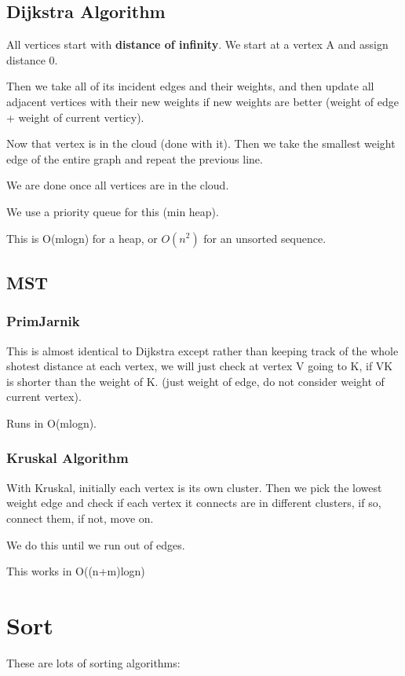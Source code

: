 \documentclass[12pt,letterpaper]{article} \usepackage{amsmath} \usepackage{graphicx} \usepackage[margin=1in]{geometry} \usepackage{longtable}  \usepackage{amssymb}
\begin{document}
	\subsection{Dijkstra Algorithm}
	All vertices start with \textbf{distance of infinity}. We start at a vertex A and assign distance 0. 
	
	Then we take all of its incident edges and their weights, and then update all adjacent vertices with their new weights if new weights are better (weight of edge + weight of current verticy).
	
	Now that vertex is in the cloud (done with it). Then we take the smallest weight edge of the entire graph and repeat the previous line. 
	
	We are done once all vertices are in the cloud. 
	
	We use a priority queue for this (min heap).
	
	This is O(mlogn) for a heap, or $O(n^2)$ for an unsorted sequence.  
	
	\subsection{MST}
	
	\subsubsection{PrimJarnik}
	This is almost identical to Dijkstra except rather than keeping track of the whole shotest distance at each vertex, we will just check at vertex V going to K, if VK is shorter than the weight of K. (just weight of edge, do not consider weight of current vertex).
	
	Runs in O(mlogn).
	
	\subsubsection{Kruskal Algorithm}
	With Kruskal, initially each vertex is its own cluster. Then we pick the lowest weight edge and check if each vertex it connects are in different clusters, if so, connect them, if not, move on.
	
	We do this until we run out of edges. 
	
	This works in O((n+m)logn)
	
	\section{Sort}
	These are lots of sorting algorithms:
	
\end{document}
